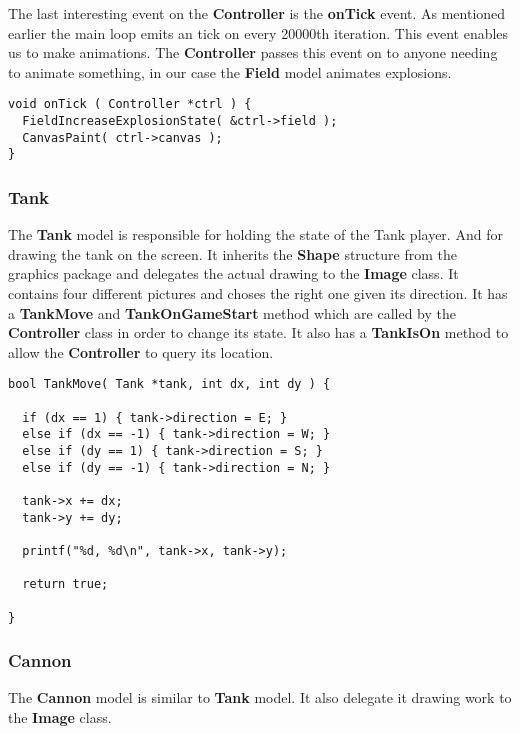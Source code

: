 The last interesting event on the {\bf Controller} is the {\bf onTick} event. As mentioned earlier
the main loop emits an tick on every 20000th iteration. This event enables us to make animations.
The {\bf Controller} passes this event on to anyone needing to animate something, in our case the
{\bf Field} model animates explosions.
\begin{lstlisting}
void onTick ( Controller *ctrl ) {
  FieldIncreaseExplosionState( &ctrl->field );
  CanvasPaint( ctrl->canvas );
}
\end{lstlisting}


\subsubsection{Tank}
The {\bf Tank} model is responsible for holding the state of the Tank player. And for drawing the
tank on the screen. It inherits the {\bf Shape} structure from the graphics package and delegates
the actual drawing to the {\bf Image} class. It contains four different pictures and choses the
right one given its direction. It has a {\bf TankMove} and {\bf TankOnGameStart} method which are
called by the {\bf Controller} class in order to change its state. It also has a {\bf TankIsOn}
method to allow the {\bf Controller} to query its location.

\begin{lstlisting}
bool TankMove( Tank *tank, int dx, int dy ) {

  if (dx == 1) { tank->direction = E; }
  else if (dx == -1) { tank->direction = W; }
  else if (dy == 1) { tank->direction = S; }
  else if (dy == -1) { tank->direction = N; }

  tank->x += dx;
  tank->y += dy;

  printf("%d, %d\n", tank->x, tank->y);

  return true;

}
\end{lstlisting}
\subsubsection{Cannon}
The {\bf Cannon} model is similar to {\bf Tank} model. It also delegate it drawing work to the {\bf
  Image} class.

